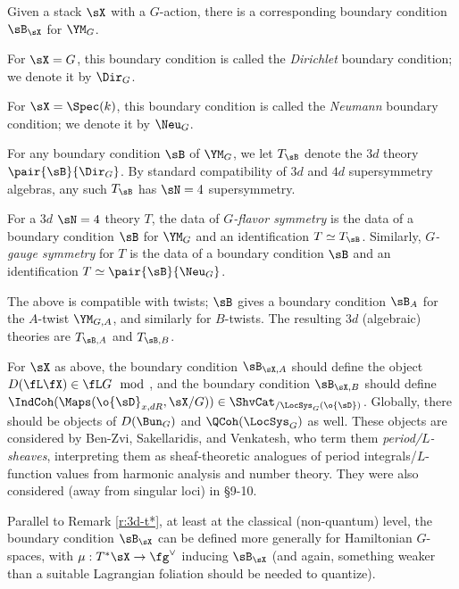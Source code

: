 \subsubsection{}\label{sss:bx-ym}

Given a stack $\sX$ with a $G$-action, there is a corresponding
boundary condition $\sB_{\sX}$ for $\YM_G$.

For $\sX = G$, this boundary condition is called the \emph{Dirichlet}
boundary condition; we denote it by $\Dir_G$.

For $\sX = \Spec(k)$, this boundary condition is called the \emph{Neumann}
boundary condition; we denote it by $\Neu_G$.

For any boundary condition $\sB$ of $\YM_G$, we let $T_{\sB}$ denote
the $3d$ theory $\pair{\sB}{\Dir_G}$. By standard compatibility of $3d$ and $4d$
supersymmetry algebras, any such $T_{\sB}$ has $\sN = 4$ supersymmetry.

For a $3d$ $\sN = 4$ theory $T$, the data of \emph{$G$-flavor symmetry}
is the data of a boundary condition $\sB$ for $\YM_G$ and an identification
$T \simeq T_{\sB}$. Similarly, \emph{$G$-gauge symmetry} for $T$
is the data of a boundary condition $\sB$ and an identification
$T \simeq \pair{\sB}{\Neu_G}$.

The above is compatible with twists; $\sB$ gives a boundary condition
$\sB_A$ for the $A$-twist $\YM_{G,A}$, and similarly for $B$-twists.
The resulting $3d$ (algebraic) theories are $T_{\sB,A}$ and $T_{\sB,B}$.

\begin{rem}
\notready

For $\sX$ as above, the boundary condition $\sB_{\sX,A}$ should define
the object $D(\fL \fX) \in \fL G\mod$, and the boundary condition
$\sB_{\sX,B}$ should define $\IndCoh(\Maps(\o{\sD}_{x,dR},\sX/G)) \in
\ShvCat_{/\LocSys_G(\o{\sD})}$. Globally, there should be objects
of $D(\Bun_G)$ and $\QCoh(\LocSys_G)$ as well. These objects
are considered by Ben-Zvi, Sakellaridis, and Venkatesh, who
term them \emph{period/$L$-sheaves}, interpreting
them as sheaf-theoretic analogues of period integrals/$L$-function values
from harmonic analysis and number theory. They were also considered
(away from singular loci) in \cite{gaiotto-s} \S 9-10.

\end{rem}

\begin{rem}
\notready

Parallel to Remark \ref{r:3d-t*}, at least at the classical (non-quantum) level,
the boundary condition $\sB_{\sX}$ can be defined more generally for
Hamiltonian $G$-spaces, with $\mu:T^*\sX \to \fg^{\vee}$ inducing
$\sB_{\sX}$ (and again, something weaker than
a suitable Lagrangian foliation should be needed to quantize).

\end{rem}

